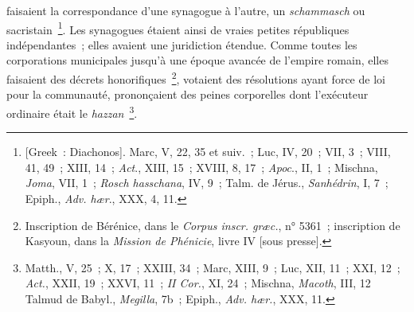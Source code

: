 \documentclass[french,twoside]{book} %
\begin{document}
faisaient la correspondance d’une synagogue à l’autre, un {\itshape schammasch} ou sacristain \footnote{ [Greek : Diachonos]. Marc, V, 22, 35 et suiv. ; Luc, IV, 20 ; VII, 3 ; VIII, 41, 49 ; XIII, 14 ; {\itshape Act}., XIII, 15 ; XVIII, 8, 17 ; {\itshape Apoc}., II, 1 ; Mischna, {\itshape Joma}, VII, 1 ; {\itshape Rosch hasschana}, IV, 9 ; Talm. de Jérus., {\itshape Sanhédrin}, I, 7 ; Epiph., {\itshape Adv. hær}., XXX, 4, 11.}. Les synagogues étaient ainsi de vraies petites républiques indépendantes ; elles avaient une juridiction étendue. Comme toutes les corporations municipales jusqu’à une époque avancée de l’empire romain, elles faisaient des décrets honorifiques \footnote{ Inscription de Bérénice, dans le {\itshape Corpus inscr. græc.}, n° 5361 ; inscription de Kasyoun, dans la {\itshape Mission de Phénicie}, livre IV [sous presse].}, votaient des résolutions ayant force de loi pour la communauté, prononçaient des peines corporelles dont l’exécuteur ordinaire était le {\itshape hazzan} \footnote{ Matth., V, 25 ; X, 17 ; XXIII, 34 ; Marc, XIII, 9 ; Luc, XII, 11 ; XXI, 12 ; {\itshape Act.}, XXII, 19 ; XXVI, 11 ; {\itshape II Cor.}, XI, 24 ; Mischna, {\itshape Macoth}, III, 12 Talmud de Babyl., {\itshape Megilla}, 7b ; Epiph., {\itshape Adv. hær.}, XXX, 11.}.\par
\end{document}
